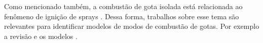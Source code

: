 Como mencionado também, a combustão de gota isolada está relacionada ao fenômeno de ignição de sprays \cite{AggarwalS2014}.
Dessa forma, trabalhos sobre esse tema são relevantes para identificar modelos de modos de combustão de gotas.
Por exemplo a revisão \cite{ZhangY2023ECM} e os modelos \cite{ZhouH2021,ZhouH2021CAF}. 




